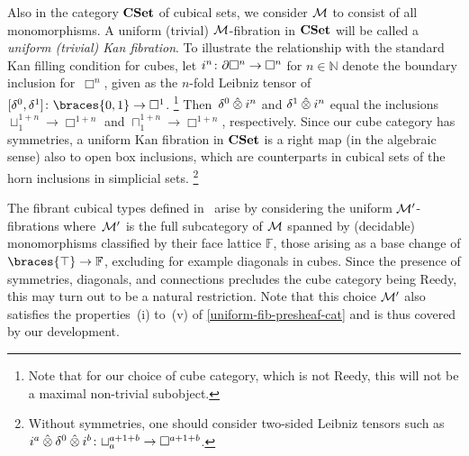 \documentclass[reqno,10pt,a4paper,oneside,draft]{amsart}
\begin{document}
\begin{example} Also in the category $\CSet$  of cubical sets, we consider $\cal{M}$ to consist of all monomorphisms. A uniform (trivial) $\cal{M}$-fibration in $\CSet$ will be called a \emph{uniform (trivial) Kan fibration}.
To illustrate the relationship with the standard Kan filling condition for cubes, let $i^n \co \partial \Box^n \to \Box^n$ for $n \in \mathbb{N}$ denote the boundary inclusion for~$\Box^n$, given as the $n$-fold Leibniz tensor of $[\lcyl, \rcyl] \co \braces{0, 1} \to \Box^1$.%
\footnote{Note that for our choice of cube category, which is not Reedy, this will not be a maximal non-trivial subobject.}
Then~$\lcyl \hatotimes i^n$ and $\rcyl \hatotimes i^n$ equal the inclusions $\sqcup_1^{1+n} \to \Box^{1+n}$ and $\sqcap_1^{1+n} \to \Box^{1+n}$, respectively.
Since our cube category has symmetries, a uniform Kan fibration in $\CSet$ is a right map (in the algebraic sense) also to open box inclusions, which are
counterparts in cubical sets of the horn inclusions in simplicial sets.%
\footnote{Without symmetries, one should consider two-sided Leibniz tensors such as $i^a \hatotimes \lcyl \hatotimes i^b \co \sqcup_a^{a+1+b} \to \Box^{a+1+b}$.}

The fibrant cubical types defined in~\cite{cohen-et-al:cubicaltt} arise by considering the uniform $\cal{M}'$-fibrations where~$\cal{M}'$ is the full subcategory of $\cal{M}$ spanned by (decidable) monomorphisms classified by their face lattice $\mathbb{F}$, \ie those arising as a base change of $\braces{\top} \to \mathbb{F}$, excluding for example diagonals in cubes.
Since the presence of symmetries, diagonals, and connections precludes the cube category being Reedy, this may turn out to be a natural restriction.
Note that this choice $\cal{M}'$ also satisfies the properties~(i) to~(v) of \cref{uniform-fib-presheaf-cat} and is thus covered by our development.
\end{example}
\end{document}
